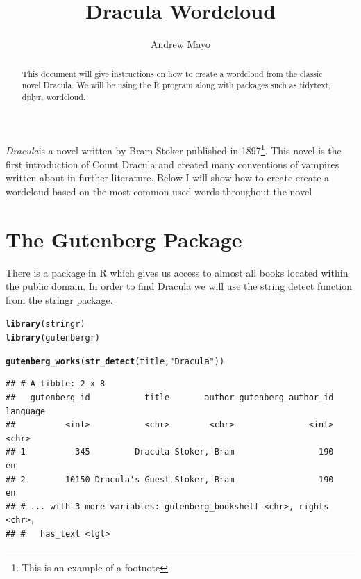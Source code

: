 \documentclass{article}\usepackage[]{graphicx}\usepackage[]{color}
\makeatletter
\newcommand{\hlstr}[1]{\textcolor[rgb]{0.192,0.494,0.8}{#1}}%
\newcommand{\hlstd}[1]{\textcolor[rgb]{0.345,0.345,0.345}{#1}}%
\newcommand{\hlkwd}[1]{\textcolor[rgb]{0.737,0.353,0.396}{\textbf{#1}}}%
\newenvironment{kframe}{%
 \def\at@end@of@kframe{}%
 \ifinner\ifhmode%
  \def\at@end@of@kframe{\end{minipage}}%
  \begin{minipage}{\columnwidth}%
 \fi\fi%
 \def\FrameCommand##1{\hskip\@totalleftmargin \hskip-\fboxsep
 \colorbox{shadecolor}{##1}\hskip-\fboxsep
     \hskip-\linewidth \hskip-\@totalleftmargin \hskip\columnwidth}%
 \MakeFramed {\advance\hsize-\width
   \@totalleftmargin\z@ \linewidth\hsize
   \@setminipage}}%
 {\par\unskip\endMakeFramed%
 \at@end@of@kframe}
\newenvironment{knitrout}{}{} %
\makeatother
\begin{document}
\title{Dracula Wordcloud}
\author{Andrew Mayo}
\maketitle

\begin{abstract}
This document will give instructions on how to create a wordcloud from the classic novel Dracula.  We will be using the R program along with packages such as tidytext, dplyr, wordcloud.

\end{abstract}

\textit{Dracula}is a novel written by Bram Stoker published in 1897\footnote{This is an example of a footnote}.  This novel is the first introduction of Count Dracula and created many conventions of vampires written about in further literature.  Below I will show how to create create a wordcloud based on the most common used words throughout the novel

\section{The Gutenberg Package}
There is a package in R which gives us access to almost all books located within the public domain.  In order to find Dracula we will use the string detect function from the stringr package.

\begin{knitrout}
\color{fgcolor}\begin{kframe}
\begin{alltt}
\hlkwd{library}\hlstd{(stringr)}
\hlkwd{library}\hlstd{(gutenbergr)}

\hlkwd{gutenberg_works}\hlstd{(}\hlkwd{str_detect}\hlstd{(title,} \hlstr{"Dracula"}\hlstd{))}
\end{alltt}
\begin{verbatim}
## # A tibble: 2 x 8
##   gutenberg_id           title       author gutenberg_author_id language
##          <int>           <chr>        <chr>               <int>    <chr>
## 1          345         Dracula Stoker, Bram                 190       en
## 2        10150 Dracula's Guest Stoker, Bram                 190       en
## # ... with 3 more variables: gutenberg_bookshelf <chr>, rights <chr>,
## #   has_text <lgl>
\end{verbatim}
\end{kframe}
\end{knitrout}
\end{document}
